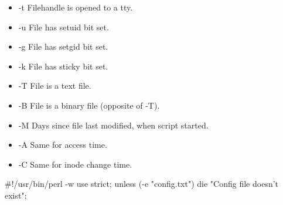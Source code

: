 \documentclass{report}
\begin{document}
\begin{itemize}
\begin{itemize}
                \item -t Filehandle is opened to a tty.
                \item -u File has setuid bit set.
                \item -g File has setgid bit set.
                \item -k File has sticky bit set.
                \item -T File is a text file.
                \item -B File is a binary file (opposite of -T).
                \item -M Days since file last modified, when script started.
                \item -A Same for access time.
                \item -C Same for inode change time.
            \end{itemize}
            \bigbreak \noindent 
            \begin{perlcode}
                #!/usr/bin/perl -w
                use strict;
                unless (-e "config.txt") {
                    die "Config file doesn’t exist";
                }


\end{perlcode}
\end{itemize}
\end{document}
